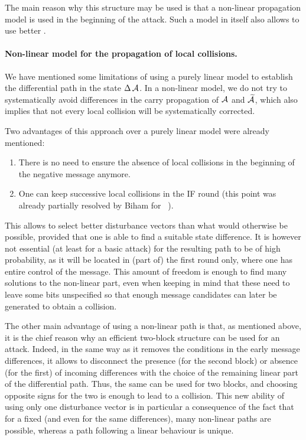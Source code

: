 The main reason why this structure may be used is that a non-linear propagation model is used in the beginning of the attack. Such a model in itself also allows to use
better \dvs.

\paragraph{Non-linear model for the propagation of local collisions.}
We have mentioned some limitations of using a purely linear model to establish the differential path in the state $\operatorname{\Delta}\mathcal{A}$. In a non-linear model, we do not
try to systematically avoid differences in the carry propagation of $\mathcal{A}$ and $\mathcal{\widetilde A}$, which also implies that not every local collision will be systematically
corrected.

Two advantages of this approach over a purely linear model were already mentioned:
\begin{enumerate}
\item There is no need to ensure the absence of local collisions in the beginning of the negative message anymore.
\item One can keep successive local collisions in the IF round (this point was already partially resolved by Biham \etal for \shazero~\cite{DBLP:conf/eurocrypt/BihamCJCLJ05}).
\end{enumerate}

This allows to select better disturbance vectors than what would otherwise be possible, provided that one is able to find a suitable state difference. It is however not
essential (at least for a basic attack) for the resulting path to be of high probability, as it will be located in (part of) the first round only, where one has entire
control of the message. This amount of freedom is enough to find many solutions to the non-linear part, even when keeping in mind that these need to leave some bits unspecified
so that enough message candidates can later be generated to obtain a collision.

The other main advantage of using a non-linear path is that, as mentioned above, it is the chief reason why an efficient two-block structure can be used for an attack. Indeed,
in the same way as it removes the conditions in the early message differences, it allows to disconnect the presence (for the second block) or absence (for the first)
of incoming \iv differences with the choice of the remaining linear part of the differential path. Thus, the same \dv can be used for two blocks, and choosing opposite signs for the two
is enough to lead to a collision. This new ability of using only one disturbance vector is in particular a consequence of the fact that for a fixed \dv (and even for the same \iv differences), many non-linear paths are possible,
whereas a path following a linear behaviour is unique.

